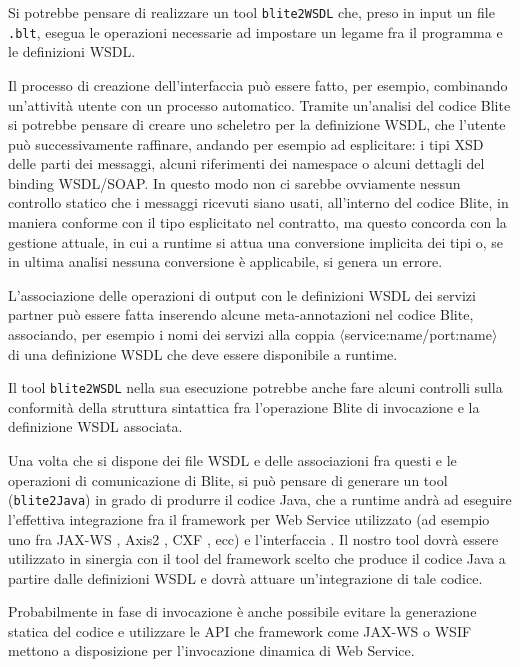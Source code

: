 Si potrebbe pensare di realizzare un tool \texttt{blite2WSDL} che, preso in
input un file \texttt{.blt}, esegua le operazioni necessarie ad impostare un
legame fra il programma e le definizioni WSDL.

Il processo di creazione dell'interfaccia può essere fatto, per esempio,
combinando un'attività utente con un processo automatico. 
Tramite un'analisi del codice Blite si potrebbe pensare di creare uno
scheletro per la definizione WSDL, che l'utente può successivamente
raffinare, andando per esempio ad esplicitare: i tipi XSD delle parti dei
messaggi, alcuni riferimenti dei namespace o alcuni dettagli del binding
WSDL/SOAP. In questo modo non ci sarebbe ovviamente nessun controllo statico che
i messaggi ricevuti siano usati, all'interno del codice Blite, in maniera
conforme con il tipo esplicitato nel contratto, ma questo concorda con la gestione
attuale, in cui a runtime si attua una conversione implicita dei tipi o, se in
ultima analisi nessuna conversione è applicabile, si genera un errore. 

L'associazione delle operazioni di output con le definizioni WSDL dei servizi
partner può essere fatta inserendo alcune meta-annotazioni nel codice Blite,
associando, per esempio i nomi dei servizi alla coppia
$\langle$service:name/port:name$\rangle$ di una definizione WSDL che deve
essere disponibile a runtime.

Il tool \texttt{blite2WSDL} nella sua esecuzione potrebbe anche fare alcuni
controlli sulla conformità della struttura sintattica fra l'operazione Blite di
invocazione e la definizione WSDL associata.

Una volta che si dispone dei file WSDL e delle associazioni fra questi e le
operazioni di comunicazione di Blite, si può pensare di generare un tool
(\texttt{blite2Java}) in grado di produrre il codice Java, che a
runtime andrà ad eseguire l'effettiva integrazione fra il framework per Web
Service utilizzato (ad esempio uno fra JAX-WS \cite{JAXWS}, Axis2 \cite{AXIS},
CXF \cite{CXF}, ecc) e l'interfaccia . Il nostro tool
dovrà essere utilizzato in sinergia con il tool del framework scelto che produce
il codice Java a partire dalle definizioni WSDL e dovrà attuare un'integrazione
di tale codice.

Probabilmente in fase di invocazione è anche possibile evitare la generazione
statica del codice e utilizzare le API che framework come JAX-WS o WSIF mettono
a disposizione per l'invocazione dinamica di Web Service.

